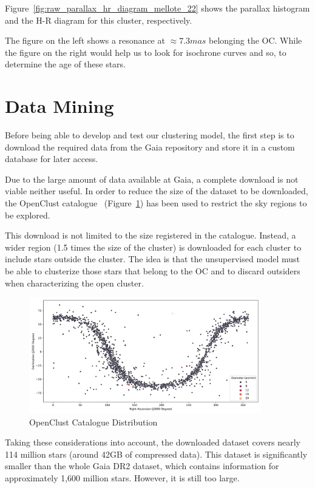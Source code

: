 \documentclass[11pt, a4paper, english]{book}
\begin{document}
Figure~\ref{fig:raw_parallax_hr_diagram_mellote_22} shows the parallax histogram and the H-R diagram for this cluster, respectively.

The figure on the left shows a resonance at \(\approx 7.3mas\) belonging the OC.
While the figure on the right would help us to look for isochrone curves and so,
to determine the age of these stars.

\section{Data Mining}
\label{sec:data_mining}

Before being able to develop and test our clustering model,
the first step is to download the required data from the Gaia repository
and store it in a custom database for later access.

Due to the large amount of data available at Gaia, a complete download is not viable neither useful.
In order to reduce the size of the dataset to be downloaded,
the OpenClust catalogue~\cite{dias2002new} (Figure~\ref{fig:OpenClustComplete})
has been used to restrict the sky regions to be explored.

This download is not limited to the size registered in the catalogue.
Instead, a wider region (1.5 times the size of the cluster) is downloaded for each cluster to include stars outside the cluster.
The idea is that the unsupervised model must be able to clusterize those stars that belong to the OC
and to discard outsiders when characterizing the open cluster.

\begin{figure}[htbp]
  \centering
  \includegraphics[width=0.9\textwidth]{../figures/openclust_catalogue.png}
  \caption{OpenClust Catalogue Distribution}
  \label{fig:OpenClustComplete}
\end{figure}

Taking these considerations into account, the downloaded dataset covers nearly 114 million stars (around 42GB of compressed data).
This dataset is significantly smaller than the whole Gaia DR2 dataset,
which contains information for approximately 1,600 million stars.
However, it is still too large.
\end{document}
